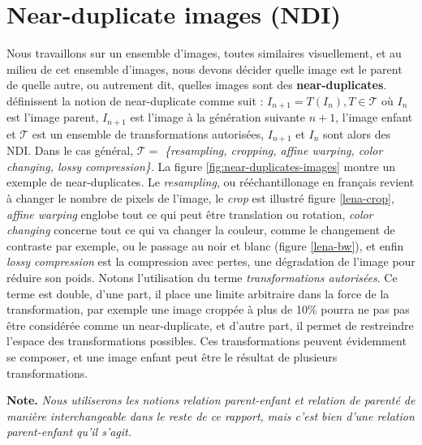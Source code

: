 \documentclass[utf8,final]{stageM2R} %
\begin{document}
\newpage

\section{Near-duplicate images (NDI)}
\label{subsec:ndi}
Nous travaillons sur un ensemble d'images, toutes similaires visuellement, et au milieu de cet ensemble d'images, nous devons décider quelle image est le parent de quelle autre, ou autrement dit, quelles images sont des \textbf{near-duplicates}.  \autocite{joly2007content} définissent la notion de near-duplicate comme suit : $I_{n+1} = T(I_{n}), T \in \mathcal{T}$ où $I_{n}$ est l'image parent, $I_{n+1}$ est l'image à la génération suivante $n+1$, l'image enfant et $\mathcal{T}$ est un ensemble de transformations autorisées, $I_{n+1}$ et $I_{n}$ sont alors des NDI. Dans le cas général, $\mathcal{T} = $ \textit{\{resampling, cropping, affine warping, color changing, lossy compression\}}. La figure \ref{fig:near-duplicates-images} montre un exemple de near-duplicates. Le \textit{resampling}, ou rééchantillonage en français revient à changer le nombre de pixels de l'image, le \textit{crop} est illustré figure \ref{lena-crop}, \textit{affine warping} englobe tout ce qui peut être translation ou rotation, \textit{color changing} concerne tout ce qui va changer la couleur, comme le changement de contraste par exemple, ou le passage au noir et blanc (figure \ref{lena-bw}), et enfin \textit{lossy compression} est la compression avec pertes, une dégradation de l'image pour réduire son poids.
Notons l'utilisation du terme \textit{transformations autorisées}. Ce terme est double, d'une part, il place une limite arbitraire dans la force de la transformation, par exemple une image croppée à plus de 10\% pourra ne pas pas être considérée comme un near-duplicate, et d'autre part, il permet de restreindre l'espace des transformations possibles. 
Ces transformations peuvent évidemment se composer, et une image enfant peut être le résultat de plusieurs transformations.


\vspace{5mm}
\textbf{Note.} \textit{Nous utiliserons les notions relation parent-enfant et relation de parenté de manière interchangeable dans le reste de ce rapport, mais c'est bien d'une relation parent-enfant qu'il s'agit.}
\end{document}
